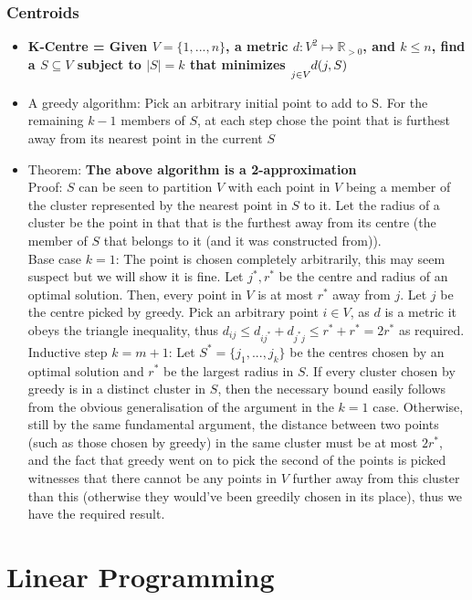 \documentclass[20pt,a4paper,landscape]{extarticle}
\let\max\relax
\DeclareMathOperator*{\max}{max\:}
\begin{document}
\begin{flushleft}
\subsubsection{Centroids}
\begin{itemize}
\item \textbf{K-Centre = Given $V=\{1, ..., n\}$, a metric $d: V^2 \mapsto \mathbb{R}_{>0}$, and $k \leq n$, find a $S \subseteq V$ subject to $|S|=k$ that minimizes $\underset{j \in V}{\max}d(j, S)$}
\item A greedy algorithm: Pick an arbitrary initial point to add to S. For the remaining $k-1$ members of $S$, at each step chose the point that is furthest away from its nearest point in the current $S$
\item Theorem: \textbf{The above algorithm is a 2-approximation}\\
Proof: $S$ can be seen to partition $V$ with each point in $V$ being a member of the cluster represented by the nearest point in $S$ to it. Let the radius of a cluster be the point in that that is the furthest away from its centre (the member of $S$ that belongs to it (and it was constructed from)).\\
Base case $k=1$: The point is chosen completely arbitrarily, this may seem suspect but we will show it is fine. Let $j^\ast, r^\ast$ be the centre and radius of an optimal solution. Then, every point in $V$ is at most $r^\ast$ away from $j$. Let $j$ be the centre picked by greedy. Pick an arbitrary point $i \in V$, as $d$ is a metric it obeys the triangle inequality, thus $d_{ij} \leq d_{ij^\ast} + d_{j^\ast j} \leq r^\ast + r^\ast = 2r^\ast$ as required.\\
Inductive step $k=m+1$: Let $S^\ast = \{j_1, ..., j_k\}$ be the centres chosen by an optimal solution and $r^\ast$ be the largest radius in $S$. If every cluster chosen by greedy is in a distinct cluster in $S$, then the necessary bound easily follows from the obvious generalisation of the argument in the $k=1$ case. Otherwise, still by the same fundamental argument, the distance between two points (such as those chosen by greedy) in the same cluster must be at most $2r^\ast$, and the fact that greedy went on to pick the second of the points is picked witnesses that there cannot be any points in $V$ further away from this cluster than this (otherwise they would've been greedily chosen in its place), thus we have the required result.
\end{itemize}
\clearpage
\section{Linear Programming}

\end{flushleft}
\end{document}
